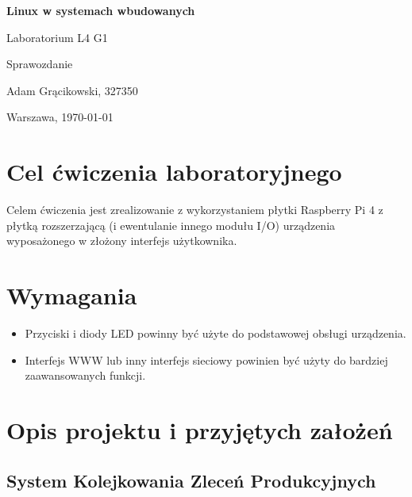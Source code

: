 \documentclass{article}
\begin{document}
\begin{titlepage}
    \centering
    \vfill    
    {\fontsize{40}{20}\selectfont \textbf{Linux w systemach wbudowanych} \par}
    \vspace{2cm}
    {\fontsize{30}{20}\selectfont Laboratorium L4 G1\par}
    \vspace{2cm}
    {\fontsize{20}{20}\selectfont Sprawozdanie\par}
    \vfill
    {\fontsize{10}{20}\selectfont Adam Grącikowski, 327350\par}
    \vspace{1cm}
    Warszawa, \today
\end{titlepage}



\tableofcontents
\newpage
\section{Cel ćwiczenia laboratoryjnego}

 Celem ćwiczenia jest zrealizowanie z wykorzystaniem płytki Raspberry Pi 4 z płytką rozszerzającą (i ewentulanie innego modułu I/O) urządzenia wyposażonego w złożony interfejs użytkownika.

\section{Wymagania}

\begin{itemize}
    \item Przyciski i diody LED powinny być użyte do  podstawowej obsługi urządzenia.
    \item Interfejs WWW lub inny interfejs sieciowy powinien być użyty do bardziej zaawansowanych funkcji.
\end{itemize}

\section{Opis projektu i przyjętych założeń}

\subsection{System Kolejkowania Zleceń Produkcyjnych}
\end{document}
